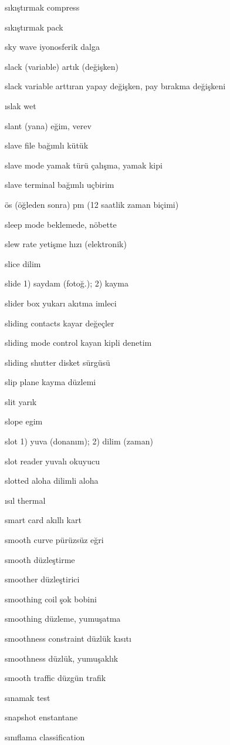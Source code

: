 \documentclass[12pt,fleqn]{article}\usepackage{../../common}
\begin{document}
sıkıştırmak compress

sıkıştırmak pack

sky wave iyonosferik dalga

slack (variable) artık (değişken)

slack variable arttıran yapay değişken, pay bırakma değişkeni

ıslak wet

slant (yana) eğim, verev

slave file bağımlı kütük

slave mode yamak türü çalışma, yamak kipi

slave terminal bağımlı uçbirim

ös (öğleden sonra) pm (12 saatlik zaman biçimi)

sleep mode beklemede, nöbette

slew rate yetişme hızı (elektronik)

slice dilim

slide 1) saydam (fotoğ.); 2) kayma

slider box yukarı akıtma imleci

sliding contacts kayar değeçler

sliding mode control kayan kipli denetim

sliding shutter disket sürgüsü

slip plane kayma düzlemi

slit yarık

slope egim

slot 1) yuva (donanım); 2) dilim (zaman)

slot reader yuvalı okuyucu

slotted aloha dilimli aloha

ısıl thermal

smart card akıllı kart

smooth curve pürüzsüz eğri

smooth düzleştirme

smoother düzleştirici

smoothing coil şok bobini

smoothing düzleme, yumuşatma

smoothness constraint düzlük kısıtı

smoothness düzlük, yumuşaklık

smooth traffic düzgün trafik

sınamak test

snapshot enstantane

sınıflama classification
\end{document}
